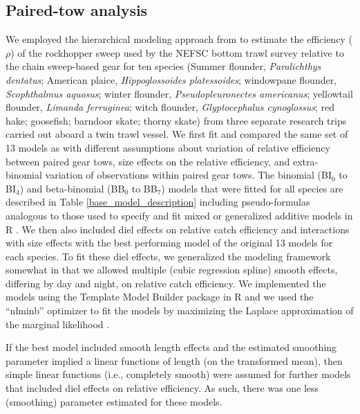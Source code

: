 \documentclass[
  12pt,
]{article}
\begin{document}
\hypertarget{paired-tow-analysis}{%
\subsection{Paired-tow analysis}\label{paired-tow-analysis}}

We employed the hierarchical modeling approach from \citet{miller13} to
estimate the efficiency (\(\rho\)) of the rockhopper sweep used by the
NEFSC bottom trawl survey relative to the chain sweep-based gear for ten
species (Summer flounder, \emph{Paralichthys dentatus}; American plaice,
\emph{Hippoglossoides platessoides}; windowpane flounder,
\emph{Scophthalmus aquosus}; winter flounder, \emph{Pseudopleuronectes
americanus}; yellowtail flounder, \emph{Limanda ferruginea}; witch
flounder, \emph{Glyptocephalus cynoglossus}; red hake; goosefish;
barndoor skate; thorny skate) from three separate research trips carried
out aboard a twin trawl vessel. We first fit and compared the same set
of 13 models as \citet{miller13} with different assumptions about
variation of relative efficiency between paired gear tows, size effects
on the relative efficiency, and extra-binomial variation of observations
within paired gear tows. The binomial (BI\(_0\) to BI\(_4\)) and
beta-binomial (BB\(_0\) to BB\(_7\)) models that were fitted for all
species are described in Table \ref{base_model_description} including
pseudo-formulas analogous to those used to specify and fit mixed or
generalized additive models in R \citep{R19,wood06}. We then also
included diel effects on relative catch efficiency and interactions with
size effects with the best performing model of the original 13 models
for each species. To fit these diel effects, we generalized the modeling
framework somewhat in that we allowed multiple (cubic regression spline)
smooth effects, differing by day and night, on relative catch
efficiency. We implemented the models using the Template Model Builder
package \citep{kristensenetal16} in R and we used the ``nlminb''
optimizer to fit the models by maximizing the Laplace approximation of
the marginal likelihood \citep{R19}.

If the best model included smooth length effects and the estimated
smoothing parameter implied a linear functions of length (on the
transformed mean), then simple linear functions (i.e., completely
smooth) were assumed for further models that included diel effects on
relative efficiency. As such, there was one less (smoothing) parameter
estimated for these models.
\end{document}
